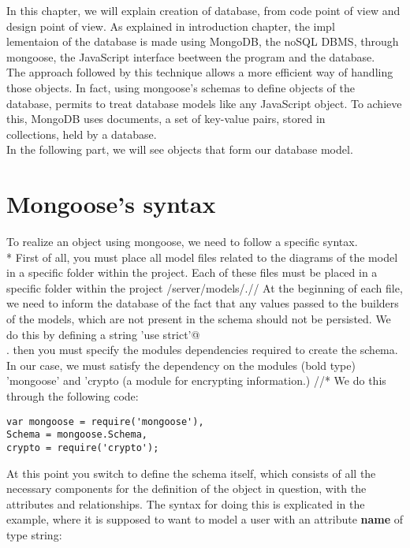 
In this chapter, we will explain creation of database, from code point of view and design point of view. As explained in introduction chapter, the impl\\
lementaion of the database is made using MongoDB, the noSQL DBMS, through mongoose, the JavaScript interface beetween the program and the database.
\\
The approach followed by this technique allows a more efficient way of handling those objects. In fact, using mongoose's schemas to define objects of the\\
database, permits to treat database models like any JavaScript object. To achieve this, MongoDB uses documents, a set of key-value pairs, stored in \\
collections, held by a database. 
\\
In the following part, we will see objects that form our database model.

\section{Mongoose's syntax}
To realize an object using mongoose, we need to follow a specific syntax. \\* First of all, you must place all model files related to the diagrams of the model in a specific folder within the project. Each of these files must be placed in a specific folder within the project /server/models/.//
At the beginning of each file, we need to inform the database of the fact that any values ​​passed to the builders of the models, which are not present in the schema should not be persisted. We do this by defining a string \mbox{}\verb@ 'use strict'@\\.
then you must specify the modules dependencies required to create the schema. In our case, we must satisfy the dependency on the modules (bold type) 'mongoose' and 'crypto (a module for encrypting information.) //*   We do this through the following code: 


\begin{lstlisting}      
var mongoose = require('mongoose'),
Schema = mongoose.Schema,
crypto = require('crypto');
\end{lstlisting}

At this point you switch to define the schema itself, which consists of all the necessary components for the definition of the object in question, with the attributes and relationships.
The syntax for doing this is explicated in the example, where it is supposed to want to model a user with an attribute \textbf{name} of type string: 


